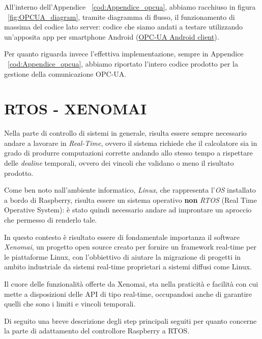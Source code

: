 All'interno dell'Appendice ~\ref{cod:Appendice_opcua}, abbiamo racchiuso in figura ~\ref{fig:OPCUA_diagram}, tramite diagramma di flusso, il funzionamento di massima del codice lato server: codice che siamo andati a testare utilizzando un'apposita app per smartphone Android (\href{https://play.google.com/store/apps/details?id=com.prosysopc.ua.android2&hl=it}{OPC-UA Android client}).

Per quanto riguarda invece l'effettiva implementazione, sempre in Appendice ~\ref{cod:Appendice_opcua}, abbiamo riportato l'intero codice prodotto per la gestione della comunicazione OPC-UA.

\newpage
\section{RTOS - XENOMAI}
\label{sec:xenomai}

Nella parte di controllo di sistemi in generale, risulta essere sempre necessario andare a lavorare in \textit{Real-Time}, ovvero il sistema richiede che il calcolatore sia in grado di produrre computazioni corrette andando allo stesso tempo a rispettare delle \textit{dealine} temporali, ovvero dei vincoli che validano o meno il risultato prodotto.

Come ben noto nall'ambiente informatico, \textit{Linux}, che rappresenta l'\textit{OS} installato a bordo di Raspberry, risulta essere un sistema operativo \textbf{non} \textit{RTOS} (Real Time Operative System): è stato quindi necessario andare ad improntare un aproccio che permesso di renderlo tale.

In questo contesto è risultato essere di fondamentale importanza il software \textit{Xenomai}, un progetto open source creato per fornire un framework real-time per le piattaforme Linux, con l'obbiettivo di aiutare la migrazione di progetti in ambito industriale da sistemi real-time proprietari a sistemi diffusi come Linux.

Il cuore delle funzionalità offerte da Xenomai, sta nella praticità e facilità con cui mette a disposizioni delle API di tipo real-time, occupandosi anche di garantire quelli che sono i limiti e vincoli temporali. 

Di seguito una breve descrizione degli step principali seguiti per quanto concerne la parte di adattamento del controllore Raspberry a RTOS.

